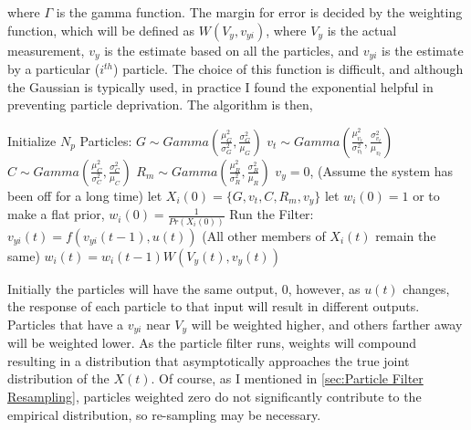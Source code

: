 where $\Gamma$ is the gamma function.
The margin for error is decided by the weighting function, which
will be defined as $W(V_y, v_{yi})$, where $V_y$ is the actual measurement, $v_y$ is the 
estimate based on all the particles, and 
$v_{yi}$ is the estimate by a particular ($i^{th}$) particle. The choice of this function is difficult,
and although the Gaussian is typically used, in practice I found the exponential helpful
in preventing particle deprivation. The algorithm is then,

\begin{algorithmic}
\STATE Initialize $N_p$ Particles:
    \STATE $G \sim Gamma(\frac{\mu^2_G}{\sigma^2_G}, \frac{\sigma^2_G}{\mu_G})$
    \STATE $v_t \sim Gamma(\frac{\mu^2_{v_t}}{\sigma^2_{v_t}}, \frac{\sigma^2_{v_t}}{\mu_{v_t}})$
    \STATE $C \sim Gamma(\frac{\mu^2_C}{\sigma^2_C}, \frac{\sigma^2_C}{\mu_C})$
    \STATE $R_m \sim Gamma(\frac{\mu^2_R}{\sigma^2_R}, \frac{\sigma^2_R}{\mu_R})$
    \STATE $v_y = 0$, (Assume the system has been off for a long time)
    \STATE let $X_i(0) = \{G, v_t, C, R_m, v_y\}$
    \STATE let $w_i(0) = 1$ or to make a flat prior, $w_i(0) = \frac{1}{Pr(X_i(0))}$ 
\ENDFOR
\STATE Run the Filter:
        \STATE $v_{yi}(t) = f(v_{yi}(t-1), u(t))$
        \STATE (All other members of $X_i(t)$ remain the same)
        \STATE $w_i(t) = w_i(t-1)W(V_y(t), v_y(t))$
    \ENDFOR
\ENDFOR
\end{algorithmic}

Initially the particles will have the same output, $0$, however, as $u(t)$
changes, the response of each particle to that input will result in different
outputs. Particles that have a $v_{yi}$ near $V_y$ will be weighted higher,
and others farther away will be weighted lower. As the particle filter
runs, weights will compound resulting in a distribution that asymptotically
approaches the true joint distribution of the $X(t)$.  Of course, as I
mentioned in \autoref{sec:Particle Filter Resampling}, particles weighted 
zero do not significantly
contribute to the empirical distribution, so re-sampling may be necessary.

